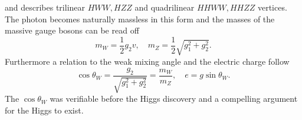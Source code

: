 and describes trilinear $HWW,HZZ$ and quadrilinear $HHWW,HHZZ$ vertices. The photon becomes naturally massless in this form and the masses of the massive gauge bosons can be read off
\begin{equation}
    m_W= \frac{1}{2}g_2v,\quad m_Z=\frac{1}{2}\sqrt{g_1^2+g_2^2}.
\end{equation}
Furthermore a relation to the weak mixing angle and the electric charge follow
\begin{equation}
    \cos\theta_W=\frac{g_2}{\sqrt{g_1^2+g_2^2}}=\frac{m_W}{m_Z}, \quad e=g\sin \theta_W.
\end{equation}
The $\cos\theta_W$ was verifiable before the Higgs discovery and a compelling argument for the Higgs to exist.

